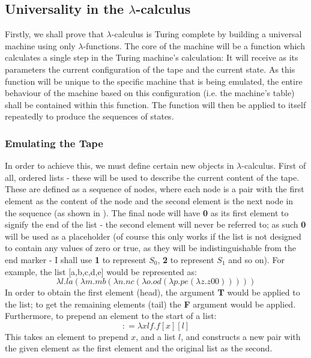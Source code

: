 \documentclass[Master.tex]{subfiles}
\begin{document}
\subsection{Universality in the $\lambda$-calculus}
Firstly, we shall prove that $\lambda$-calculus is Turing complete by building a universal machine using only $\lambda$-functions. The core of the machine will be a function which calculates a single step in the Turing machine's calculation: It will receive as its parameters the current configuration of the tape and the current state. As this function will be unique to the specific machine that is being emulated, the entire behaviour of the machine based on this configuration (i.e. the machine's table) shall be contained within this function. The function will then be applied to itself repeatedly to produce the sequences of states.

\subsubsection{Emulating the Tape}\label{sec:LambdaUnivTape}
In order to achieve this, we must define certain new objects in $\lambda$-calculus. First of all, ordered lists - these will be used to describe the current content of the tape. These are defined as a sequence of nodes, where each node is a pair with the first element as the content of the node and the second element is the next node in the sequence (as shown in \cite{tromp2007binary}). The final node will have \textbf{0} as its first element to signify the end of the list - the second element will never be referred to; as such \textbf{0} will be used as a placeholder (of course this only works if the list is not designed to contain any values of zero or true, as they will be indistinguishable from the end marker - I shall use \textbf{1} to represent $S_0$, \textbf{2} to represent $S_1$ and so on). For example, the list [a,b,c,d,e] would be represented as:
\begin{equation*}
\lambda l.la(\lambda m.mb(\lambda n.nc(\lambda o.od(\lambda p.pe(\lambda z.z\bm{\mathrm{00}})))))
\end{equation*}
In order to obtain the first element (head), the argument \textbf{T} would be applied to the list; to get the remaining elements (tail) the \textbf{F} argument would be applied. 
Furthermore, to prepend an element to the start of a list:
\begin{equation*}
\bm{\mathrm{:}} = \lambda xlf.f[x][l]
\end{equation*}
This takes an element to prepend $x$, and a list $l$, and constructs a new pair with the given element as the first element and the original list as the second.
 
\end{document}
